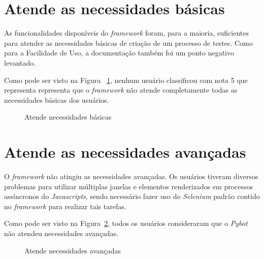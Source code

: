     \section{Atende as necessidades básicas}
        As funcionalidades disponíveis do \textit{framework} foram, para a maioria, suficientes para atender as necessidades básicas de criação de um processo de testes.
        Como para a Facilidade de Uso, a documentação também foi um ponto negativo levantado.

          Como pode ser visto na Figura ~\ref{fig:basico}, nenhum usuário classificou com nota 5 que representa representa que o \textit{framework} não atende completamente
          todas as necessidades básicas dos usuários.

        \begin{figure}[H]
            \vspace*{0,2cm}
            \centering
            \caption{Atende necessidades básicas}
            \label{fig:basico}
        \end{figure}

    \section{Atende as necessidades avançadas}
        O \textit{framework} não atingiu as necessidades avançadas. Os usuários tiveram diversos problemas para utilizar múltiplas janelas e elementos renderizados em
        processos assíncronos do \textit{Javascripts}, sendo necessário fazer uso do \textit{Selenium} padrão contido no \textit{framework} para realizar tais tarefas.

          Como pode ser visto na Figura~\ref{fig:avancado}, todos os usuários consideraram que o \textit{Pybot} não atendeu necessidades avançadas.

        \begin{figure}[H]
            \vspace*{0,2cm}
            \centering
            \caption{Atende necessidades avançadas}
            \label{fig:avancado}
        \end{figure}
